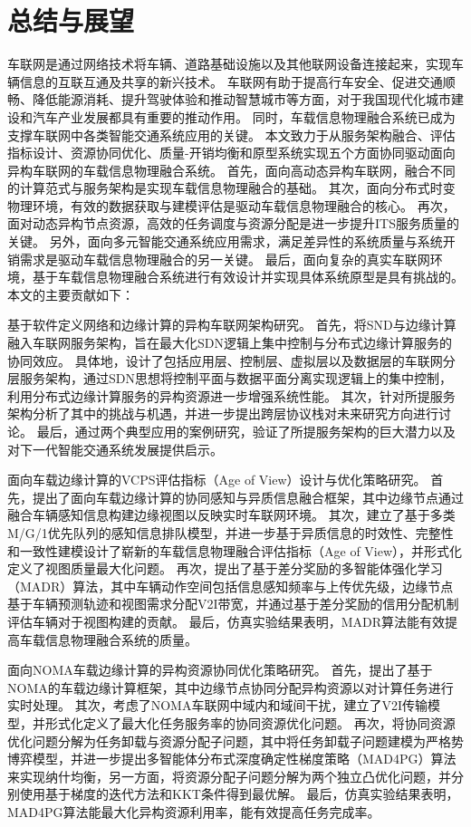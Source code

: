 \chapter{总结与展望}\label{section 7}

车联网是通过网络技术将车辆、道路基础设施以及其他联网设备连接起来，实现车辆信息的互联互通及共享的新兴技术。
车联网有助于提高行车安全、促进交通顺畅、降低能源消耗、提升驾驶体验和推动智慧城市等方面，对于我国现代化城市建设和汽车产业发展都具有重要的推动作用。
同时，车载信息物理融合系统已成为支撑车联网中各类智能交通系统应用的关键。
本文致力于从服务架构融合、评估指标设计、资源协同优化、质量-开销均衡和原型系统实现五个方面协同驱动面向异构车联网的车载信息物理融合系统。
首先，面向高动态异构车联网，融合不同的计算范式与服务架构是实现车载信息物理融合的基础。
其次，面向分布式时变物理环境，有效的数据获取与建模评估是驱动车载信息物理融合的核心。
再次，面对动态异构节点资源，高效的任务调度与资源分配是进一步提升ITS服务质量的关键。
另外，面向多元智能交通系统应用需求，满足差异性的系统质量与系统开销需求是驱动车载信息物理融合的另一关键。
最后，面向复杂的真实车联网环境，基于车载信息物理融合系统进行有效设计并实现具体系统原型是具有挑战的。
本文的主要贡献如下：

 基于软件定义网络和边缘计算的异构车联网架构研究。
首先，将SND与边缘计算融入车联网服务架构，旨在最大化SDN逻辑上集中控制与分布式边缘计算服务的协同效应。
具体地，设计了包括应用层、控制层、虚拟层以及数据层的车联网分层服务架构，通过SDN思想将控制平面与数据平面分离实现逻辑上的集中控制，利用分布式边缘计算服务的异构资源进一步增强系统性能。
其次，针对所提服务架构分析了其中的挑战与机遇，并进一步提出跨层协议栈对未来研究方向进行讨论。
最后，通过两个典型应用的案例研究，验证了所提服务架构的巨大潜力以及对下一代智能交通系统发展提供启示。

 面向车载边缘计算的VCPS评估指标（Age of View）设计与优化策略研究。
首先，提出了面向车载边缘计算的协同感知与异质信息融合框架，其中边缘节点通过融合车辆感知信息构建边缘视图以反映实时车联网环境。
其次，建立了基于多类M/G/1优先队列的感知信息排队模型，并进一步基于异质信息的时效性、完整性和一致性建模设计了崭新的车载信息物理融合评估指标（Age of View），并形式化定义了视图质量最大化问题。
再次，提出了基于差分奖励的多智能体强化学习（MADR）算法，其中车辆动作空间包括信息感知频率与上传优先级，边缘节点基于车辆预测轨迹和视图需求分配V2I带宽，并通过基于差分奖励的信用分配机制评估车辆对于视图构建的贡献。
最后，仿真实验结果表明，MADR算法能有效提高车载信息物理融合系统的质量。

 面向NOMA车载边缘计算的异构资源协同优化策略研究。
首先，提出了基于NOMA的车载边缘计算框架，其中边缘节点协同分配异构资源以对计算任务进行实时处理。
其次，考虑了NOMA车联网中域内和域间干扰，建立了V2I传输模型，并形式化定义了最大化任务服务率的协同资源优化问题。
再次，将协同资源优化问题分解为任务卸载与资源分配子问题，其中将任务卸载子问题建模为严格势博弈模型，并进一步提出多智能体分布式深度确定性梯度策略（MAD4PG）算法来实现纳什均衡，另一方面，将资源分配子问题分解为两个独立凸优化问题，并分别使用基于梯度的迭代方法和KKT条件得到最优解。
最后，仿真实验结果表明，MAD4PG算法能最大化异构资源利用率，能有效提高任务完成率。

